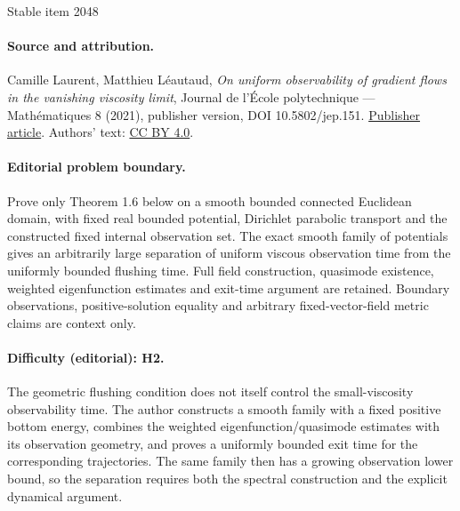 \documentclass[11pt]{article}
\numberwithin{equation}{section}
\begin{document}
\begin{center}{\Large Stable item 2048}\end{center}
\paragraph{Source and attribution.}
Camille Laurent, Matthieu Léautaud, \emph{On uniform observability of gradient flows in the vanishing viscosity limit}, Journal de l’École polytechnique — Mathématiques 8 (2021), publisher version, DOI 10.5802/jep.151. \href{https://jep.centre-mersenne.org/articles/10.5802/jep.151/}{Publisher article}. Authors' text: \href{https://creativecommons.org/licenses/by/4.0/}{CC BY 4.0}.
\paragraph{Editorial problem boundary.}
Prove only Theorem 1.6 below on a smooth bounded connected Euclidean domain, with fixed real bounded potential, Dirichlet parabolic transport and the constructed fixed internal observation set. The exact smooth family of potentials gives an arbitrarily large separation of uniform viscous observation time from the uniformly bounded flushing time. Full field construction, quasimode existence, weighted eigenfunction estimates and exit-time argument are retained. Boundary observations, positive-solution equality and arbitrary fixed-vector-field metric claims are context only.
\paragraph{Difficulty (editorial): H2.}
The geometric flushing condition does not itself control the small-viscosity observability time. The author constructs a smooth family with a fixed positive bottom energy, combines the weighted eigenfunction/quasimode estimates with its observation geometry, and proves a uniformly bounded exit time for the corresponding trajectories. The same family then has a growing observation lower bound, so the separation requires both the spectral construction and the explicit dynamical argument.
\end{document}
